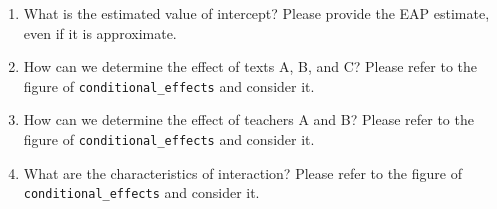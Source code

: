 \begin{enumerate}
	\item What is the estimated value of intercept? Please provide the EAP estimate, even if it is approximate.
	\item How can we determine the effect of texts A, B, and C? Please refer to the figure of \verb|conditional_effects| and consider it.
	\item How can we determine the effect of teachers A and B? Please refer to the figure of \verb|conditional_effects| and consider it.
	\item What are the characteristics of interaction? Please refer to the figure of \verb|conditional_effects| and consider it.
\end{enumerate}
